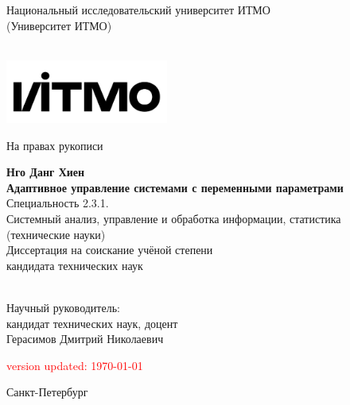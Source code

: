 \newcommand{\PhDStudent}{Нго Данг Хиен}
\newcommand{\ThesisName}{Адаптивное управление системами с переменными параметрами}
\newcommand{\MySpeciality}{Специальность 2.3.1.\\
	Системный анализ, управление и обработка информации, статистика\\
	(технические науки)}
\newcommand{\MySuperviser}{кандидат технических наук, доцент\\Герасимов Дмитрий Николаевич}

\thispagestyle{empty}

\begin{center}
	Национальный исследовательский университет ИТМО \\
	(Университет ИТМО) \\ \ \\ 
\end{center}
\begin{minipage}{16cm}
	\includegraphics[width=0.4\textwidth]{images/itmo/logo_osnovnoy_russkiy_chernyy}
	\hfill
\end{minipage}

\hfill На правах рукописи

\vspace*{60pt}
\begin{center}
	\textbf {\large
		\PhDStudent
	} \\
	\vspace*{6pt}
	\textbf{{\LARGE 
		\ThesisName
	}} \\
	\vspace*{12pt}
		\MySpeciality \\
	\vspace*{12pt}
	Диссертация на соискание учёной степени \\ кандидата технических наук \\ \ \\ 
	\vspace*{60pt}
	\begin{flushright}
		Научный руководитель:\\ \MySuperviser
	\end{flushright}
\end{center}

\vspace*{10pt}
\begin{center} %
	\textcolor{red}{\tiny {version updated: \today}}
\end{center}

\vfill	%

\begin{center}
	Санкт-Петербург~\the\year{} \\%
\end{center}


\OnehalfSpacing